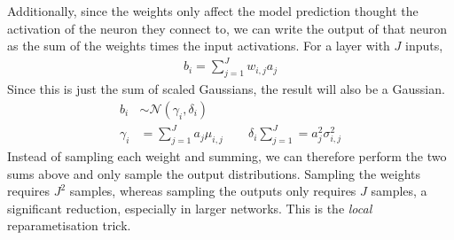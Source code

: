 Additionally, since the weights only affect the model prediction thought the activation of the neuron they connect to, we can write the output of that neuron as the sum of the weights times the input activations. For a layer with \( J \) inputs,
\begin{align}
	b_i = \sum_{j=1}^{J} w_{i,j} a_j
\end{align}
Since this is just the sum of scaled Gaussians, the result will also be a Gaussian.
\begin{align}
	b_i &\sim \mathcal{N}(\gamma_i, \delta_i)\\
	\gamma_i &= \sum_{j=1}^{J} a_j \mu_{i,j} \qquad \delta_i \sum_{j=1}^{J} = a_j^2 \sigma_{i,j}^2
\end{align}
Instead of sampling each weight and summing, we can therefore perform the two sums above and only sample the output distributions. Sampling the weights requires \( J^2 \) samples, whereas sampling the outputs only requires \( J \) samples, a significant reduction, especially in larger networks. This is the \textit{local} reparametisation trick.

